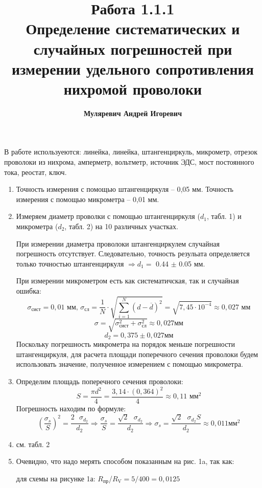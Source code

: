 \documentclass[a4paper, 10pt]{article}%
\author{\textbf{Муляревич Андрей Игоревич}}
\title{Работа 1.1.1 \\
Определение систематических и случайных погрешностей при измерении удельного сопротивления нихромой проволоки}
\begin{document}
\maketitle 
\newpage
В работе используеются: линейка, линейка, штангенциркуль, микрометр, отрезок проволоки из нихрома, амперметр, вольтметр, источник ЭДС, мост постоянного тока, реостат, ключ. 
\begin{enumerate}
\item Точность измерения с помощью штангенциркуля -- 0,05 мм. Точность измерения с помощью микрометра -- 0,01 мм.
\item Измеряем диаметр проволки с помощью штангенциркуля ($d_1$, табл. 1) и микрометра ($d_2$, табл. 2) на 10 различных участках.

При измерении диаметра проволоки штангенциркулем случайная погрешность отсутствует. Следовательно, точность резульата определяется только точностью штангенциркуля $\Rightarrow  d_1 = $ 0.44 $\pm$ 0.05 мм. 

При измерении микрометром есть как систематичская, так и случайная ошибка:
\[ \sigma_{\text{сист}}  = 0,01 \text{ мм, }
\sigma_{\text{сл}}  = \dfrac{1}{N} \cdot \sqrt{\sum_{i = 1}^N (d - \overline{d})^2} = \sqrt{7,45\cdot10^{-4}} \approx 0,027 \text{ мм}\]
\[ \sigma =  \sqrt{\sigma_{\text{сист}}^2 + \sigma_{\text{сл}}^2} \approx 0,027 \text{мм}\]
\[ d_2 = 0,375 \pm 0,027\text{мм}\]
Поскольку погрешность микрометра на порядок меньше погрешности штангенциркуля, для расчета площади поперечного сечения проволоки будем использовать значение, полученное измерением с помощью микрометра.
\item Определим площадь поперечного сечения проволоки: 
\[ S = \dfrac{ \pi d^2 }{4} = \dfrac{3,14 \cdot (0,364)^2}{4} \approx 0,11 \text{ мм}^2\]
Погрешность находим по формуле:
\[ \left( \dfrac{\sigma_{s}}{S} \right)^2 =\dfrac{2 \text{ }\sigma_{d_2}}{d_2} \Rightarrow \dfrac{\sigma_{s}}{S} = \dfrac{\sqrt{2} \text{ } \sigma_{d_2}}{d_2} \Rightarrow \sigma_{s} =\dfrac{\sqrt{2} \text{ } \sigma_{d_2} S}{d_2} \approx 0,011 \text{мм}^2\]
\item см. табл. 2
\item Очевидно, что надо мерять способом показанным на рис. 1a, так как:

для схемы на рисунке 1а: $R_{\text{пр}}$/$R_{\text{V}} = 5 / 400 = 0,0125$


\end{enumerate}
\end{document}
